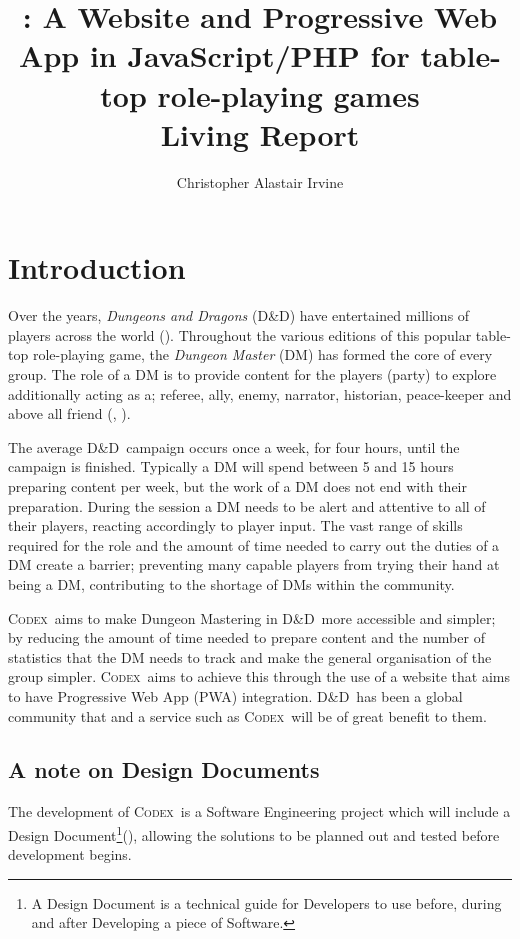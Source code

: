 \documentclass[review]{cmpreport}
\title{\Codex: A Website and Progressive Web App in JavaScript/PHP for table-top role-playing games \\ Living Report}
\author{Christopher Alastair Irvine}
\newcommand{\dnd}{D\&D}
\newcommand{\Codex}{\textsc{Codex}}
\begin{document}
	\section{Introduction}
	Over the years, \emph{Dungeons and Dragons} (\dnd) have entertained millions of players across the world (\cite{DnDOriginal}). Throughout the various editions of this popular table-top role-playing game, the \emph{Dungeon Master} (DM) has formed the core of every group. The role of a DM is to provide content for the players (party) to explore additionally acting as a; referee, ally, enemy, narrator, historian, peace-keeper and above all friend (\cite{DnDPeople}, \cite{DungeonMaster}). 
	
	The average \dnd \ campaign occurs once a week, for four hours, until the campaign is finished. Typically a DM will spend between 5 and 15 hours preparing content per week, but the work of a DM does not end with their preparation. During the session a DM needs to be alert and attentive to all of their players, reacting accordingly to player input. The vast range of skills required for the role and the amount of time needed to carry out the duties of a DM create a  barrier; preventing many capable players from trying their hand at being a DM, contributing to the shortage of DMs within the community.
			
	\Codex \ aims to make Dungeon Mastering in \dnd \ more accessible and simpler; by reducing the amount of time needed to prepare content and the number of statistics that the DM needs to track and make the general organisation of the group simpler. \Codex \ aims to achieve this through the use of a website that aims to have Progressive Web App (PWA) integration. \dnd \ has been a global community that and a service such as \Codex \ will be of great benefit to them. 
	
	\subsection{A note on Design Documents}
	The development of \Codex \ is a Software Engineering project which will include a Design Document\footnote{A Design Document is a technical guide for Developers to use before, during and after Developing a piece of Software.}(\cite{DesignDocExample}), allowing the solutions to be planned out and tested before development begins.
	
\end{document}
